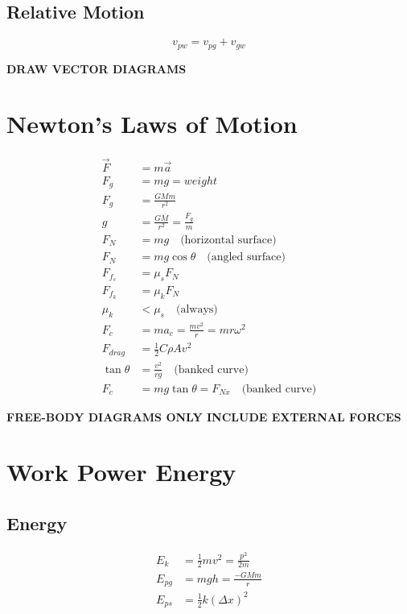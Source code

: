 \documentclass[letterpaper,10pt]{article}
\begin{document}
\begin{multicols}{2}
\subsection{Relative Motion}
\begin{equation*}
    v_{pw} = v_{pg} + v_{gw}
\end{equation*}

\medskip
\begin{center}
    \textbf{DRAW VECTOR DIAGRAMS}
\end{center}

\section{Newton's Laws of Motion}
\begin{align*}
    \vec{F} &= m \vec{a} \\
    F_g &= mg = weight \\
    F_g &= \frac{GMm}{r^2} \\
    g &= \frac{GM}{r^2} = \frac{F_g}{m} \\
    F_N &= mg \quad \textrm{(horizontal surface)} \\
    F_N &= mg \cos \theta \quad \textrm{(angled surface)} \\
    F_{f_s} &= \mu_s F_N \\
    F_{f_k} &= \mu_k F_N \\
    \mu_k &< \mu_s \quad \textrm{(always)} \\
    F_c &= m a_c = \frac{m v^2}{r} = m r \omega^2 \\
    F_{drag} &= \tfrac{1}{2} C \rho A v^2 \\
    \tan \theta &= \frac{v^2}{rg} \quad \textrm{(banked curve)} \\
    F_c &= mg \tan \theta = F_{Nx} \quad \textrm{(banked curve)}
\end{align*}

\medskip
\begin{center}
    \textbf{FREE-BODY DIAGRAMS ONLY INCLUDE EXTERNAL FORCES}
\end{center}

\section{Work Power Energy}
\subsection{Energy}
\begin{align*}
    E_k &= \tfrac{1}{2} m v^2 = \frac{p^2}{2m} \\
    E_{pg} &= mgh = \frac{-GMm}{r} \\
    E_{ps} &= \tfrac{1}{2} k \left( \Delta x \right)^2
\end{align*}


\end{multicols}
\end{document}
